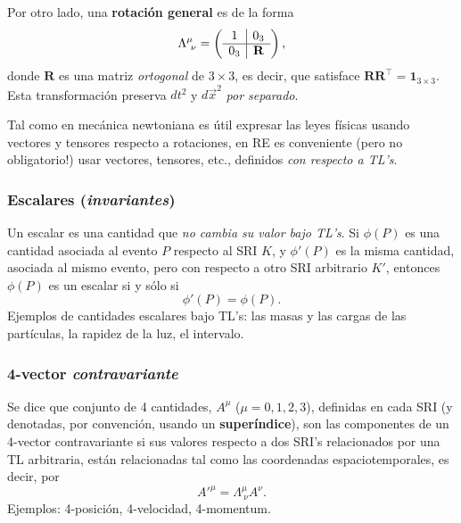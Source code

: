 Por otro lado, una \textbf{rotación general} es de la forma
\begin{equation}
\Lambda^\mu_{\ \nu}=\left(
\begin{array}[c]{c|c}
1 & 0_3 \\
\hline
0_3 & \mathbf{R}
\end{array}
\right), \label{rotgen}
\end{equation}
donde $\mathbf{R}$ es una matriz \textit{ortogonal} de $3\times 3$, es decir, que satisface $\mathbf{R}\mathbf{R}^\top=\mathbf{1}_{3\times 3}$. Esta transformación preserva $dt^2$ y $d\vec{x}^2$ \textit{por separado}.

Tal como en mecánica newtoniana es útil expresar las leyes físicas usando
vectores y tensores respecto a rotaciones, en RE es conveniente (pero no
obligatorio!) usar vectores, tensores, etc., definidos \textit{con respecto  a TL's}.

\subsubsection{Escalares (\textit{invariantes})}
Un escalar es una cantidad que \textit{no cambia su valor bajo TL's}. Si $\phi(P)$ es una cantidad asociada al evento $P$ respecto al SRI $K$, y $\phi'(P)$ es la misma cantidad, asociada al mismo evento, pero con respecto a otro SRI arbitrario $K'$, entonces $\phi(P)$ es un escalar si y sólo si
\begin{equation}
\phi'(P)=\phi(P).
\end{equation}
Ejemplos de cantidades escalares bajo TL's: las masas y las cargas de
las partículas, la rapidez de la luz, el intervalo.

\subsubsection{4-vector \textit{contravariante}}
Se dice que conjunto de 4 cantidades, $A^\mu$ ($\mu=0,1,2,3$), definidas en cada SRI (y denotadas, por convención, usando un \textbf{superíndice}), son las componentes de un 4-vector contravariante si sus valores respecto a dos SRI's relacionados por una TL arbitraria, están relacionadas tal como las coordenadas espaciotemporales, es decir, por
\begin{equation}
A'^\mu=\Lambda^\mu_{\ \nu} A^\nu .
\end{equation}
Ejemplos: 4-posición, 4-velocidad, 4-momentum.

